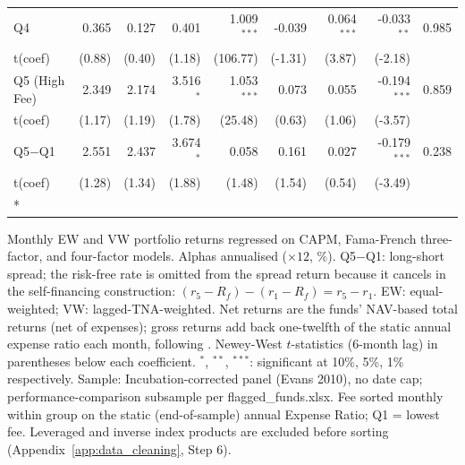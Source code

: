 {\begin{longtable}[t]{lrrrrrrrr}
\hspace{1em}Q4 & 0.365 & 0.127 & 0.401 & 1.009$^{***}$ & -0.039 & 0.064$^{***}$ & -0.033$^{**}$ & 0.985\\
\hspace{1em}t(coef) & (0.88) & (0.40) & (1.18) & (106.77) & (-1.31) & (3.87) & (-2.18) & \\
\hspace{1em}Q5 (High Fee) & 2.349 & 2.174 & 3.516$^{*}$ & 1.053$^{***}$ & 0.073 & 0.055 & -0.194$^{***}$ & 0.859\\
\hspace{1em}t(coef) & (1.17) & (1.19) & (1.78) & (25.48) & (0.63) & (1.06) & (-3.57) & \\
\hspace{1em}Q5$-$Q1 & 2.551 & 2.437 & 3.674$^{*}$ & 0.058 & 0.161 & 0.027 & -0.179$^{***}$ & 0.238\\
\hspace{1em}t(coef) & (1.28) & (1.34) & (1.88) & (1.48) & (1.54) & (0.54) & (-3.49) & \\*
\end{longtable}
}
\begin{singlespace}\footnotesize\noindent
Monthly EW and VW portfolio returns regressed on CAPM, Fama-French three-factor, and \textcite{Carhart1997} four-factor models. Alphas annualised ($\times 12$, \%). Q5$-$Q1: long-short spread; the risk-free rate is omitted from the spread return because it cancels in the self-financing construction: $(r_5 - R_f) - (r_1 - R_f) = r_5 - r_1$. EW: equal-weighted; VW: lagged-TNA-weighted. Net returns are the funds' NAV-based total returns (net of expenses); gross returns add back one-twelfth of the static annual expense ratio each month, following \textcite{FamaFrench2010}. Newey-West $t$-statistics (6-month lag) in parentheses below each coefficient. $^{*}$, $^{**}$, $^{***}$: significant at 10\%, 5\%, 1\% respectively. Sample: Incubation-corrected panel (Evans 2010), no date cap; performance-comparison subsample per flagged\_funds.xlsx. Fee sorted monthly within group on the static (end-of-sample) annual Expense Ratio; Q1 = lowest fee. Leveraged and inverse index products are excluded before sorting (Appendix~\ref{app:data_cleaning}, Step 6).
\end{singlespace}\par\vspace{24pt}


